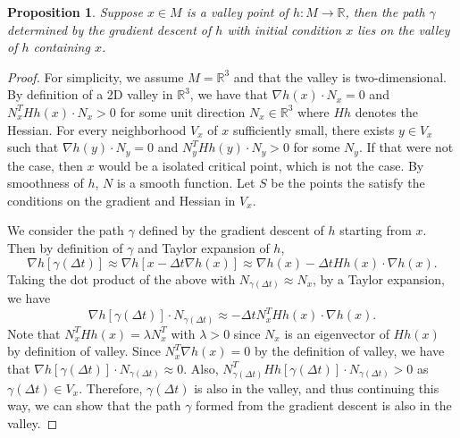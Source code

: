 \documentclass[10pt,journal,compsoc]{IEEEtran}
\newcommand{\R}{\mathbb{R}}
\newtheorem{prop}{Proposition}
\begin{document}
\begin{prop} \label{prop:valley_grad}
  Suppose $x \in M$ is a valley point of $h : M \to \R$, then the path
  $\gamma$ determined by the gradient descent of $h$ with initial
  condition $x$ lies on the valley of $h$ containing $x$.
\end{prop}
\begin{proof}
  For simplicity, we assume $M=\R^3$ and that the valley is
  two-dimensional. By definition of a 2D valley in $\R^3$, we have
  that $\nabla h(x)\cdot N_x = 0$ and $N_x^T H h(x) \cdot N_x > 0$ for
  some unit direction $N_x\in \R^3$ where $Hh$ denotes the Hessian.
  For every neighborhood $V_x$ of $x$ sufficiently small, there exists
  $y\in V_x$ such that $\nabla h(y)\cdot N_y = 0$ and
  $N_y^THh(y)\cdot N_y > 0$ for some $N_y$. If that were not the case,
  then $x$ would be a isolated critical point, which is not the
  case. By smoothness of $h$, $N$ is a smooth function. Let $S$ be the
  points the satisfy the conditions on the gradient and Hessian in
  $V_x$.

  We consider the path $\gamma$ defined by the gradient descent of $h$
  starting from $x$. Then by definition of $\gamma$ and Taylor
  expansion of $h$,
  \[
    \nabla h[ \gamma(\Delta t) ] \approx \nabla h[ x - \Delta t \nabla h(x)
    ] \approx \nabla h(x) - \Delta t H h(x) \cdot \nabla h(x).
  \]
  Taking the dot product of the above with
  $N_{ \gamma(\Delta t) } \approx N_x$, by a Taylor expansion, we have
  \[
    \nabla h[ \gamma(\Delta t) ] \cdot N_{ \gamma(\Delta t) }  \approx
    - \Delta t N_x^T Hh(x) \cdot \nabla h(x).
  \]
  Note that $N_x^THh(x) = \lambda N_x^T$ with $\lambda >0$ since $N_x$
  is an eigenvector of $Hh(x)$ by definition of valley. Since
  $N_x^T\nabla h(x) = 0$ by the definition of valley, we have that
  $\nabla h[ \gamma(\Delta t) ] \cdot N_{ \gamma(\Delta t) } \approx
  0$. Also,
  $N^T_{ \gamma(\Delta t) } Hh[ \gamma(\Delta t) ] \cdot N_{
    \gamma(\Delta t) } >0$ as $\gamma(\Delta t)\in V_x$. Therefore,
  $\gamma(\Delta t)$ is also in the valley, and thus continuing this
  way, we can show that the path $\gamma$ formed from the gradient
  descent is also in the valley.
\end{proof}
\end{document}
